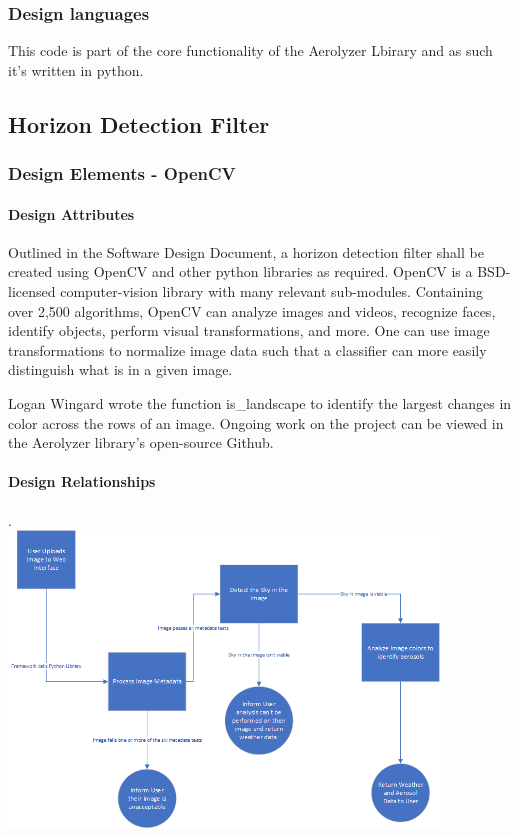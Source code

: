 \documentclass[onecolumn, draftclsnofoot,10pt, compsoc]{IEEEtran}
\begin{document}
\begin{singlespace}
      \subsubsection{Design languages}
		This code is part of the core functionality of the Aerolyzer Lbirary and as such it's written in python.
	\subsection{Horizon Detection Filter}
      \subsubsection{Design Elements - OpenCV }
      		\paragraph{Design Attributes}
          		Outlined in the Software Design Document, a horizon detection filter shall be created using OpenCV and other python libraries as required.
				OpenCV is a BSD-licensed computer-vision library with many relevant sub-modules.
				Containing over 2,500 algorithms, OpenCV can analyze images and videos, recognize faces, identify objects, perform visual transformations, and more.
				One can use image transformations to normalize image data such that a classifier can more easily distinguish what is in a given image. \cite{svm}

				Logan Wingard wrote the function is\_landscape to identify the largest changes in color across the rows of an image.
				Ongoing work on the project can be viewed in the Aerolyzer library’s open-source Github.

          \paragraph{Design Relationships}
					.\\
					\includegraphics[width=4.5in,natwidth=1907,natheight=787]{images/Design2.png}


\end{singlespace}
\end{document}

